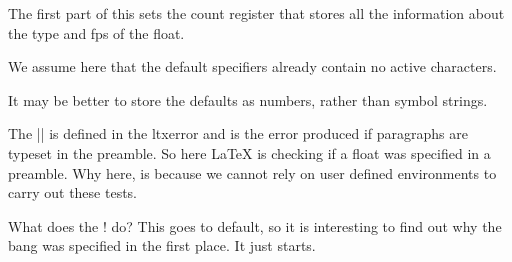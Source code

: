  \begin{macro}{\@xfloat}
     The first part of this sets the count register that stores all
     the information about the type and fps of the float.

    We assume here that the default specifiers already contain no
    active characters.

    It may be better to store the defaults as numbers, rather than
    symbol strings.

   The |\@nodocument| is defined in the ltxerror and is the error produced if paragraphs are typeset in the preamble. So here LaTeX is checking if a float was specified in a preamble. Why here, is because
we cannot rely on user defined environments to carry out these tests.

What does the ! do? This goes to default, so it is interesting to find out why the bang was specified
in the first place. It just starts.

    \begin{teX}
\def\@xfloat #1[#2]{%
  \@nodocument 
  \def \@captype {#1}%
   \def \@fps {#2}%
   \@onelevel@sanitize \@fps 
   \def \reserved@b {!}%
   \ifx \reserved@b \@fps
     \@fpsadddefault
   \else
     \ifx \@fps \@empty
       \@fpsadddefault
     \fi
   \fi
   \ifhmode
     \@bsphack
     \@floatpenalty -\@Mii
   \else
     \@floatpenalty-\@Miii
   \fi
  \ifinner
     \@parmoderr\@floatpenalty\z@
  \else
    \@next\@currbox\@freelist
      {%
       \@tempcnta \sixt@@n
       \expandafter \@tfor \expandafter \reserved@a
         \expandafter :\expandafter =\@fps 
         \do
          {%
           \if \reserved@a h%
             \ifodd \@tempcnta
             \else
               \advance \@tempcnta \@ne
             \fi
           \fi
           \if \reserved@a t%
             \@setfpsbit \tw@
           \fi
           \if \reserved@a b%
             \@setfpsbit 4%
           \fi
           \if \reserved@a p%
             \@setfpsbit 8%
           \fi
           \if \reserved@a !%
             \ifnum \@tempcnta>15
               \advance\@tempcnta -\sixt@@n\relax
             \fi
           \fi
           }%
       \@tempcntb \csname ftype@\@captype \endcsname
       \multiply \@tempcntb \@xxxii
       \advance \@tempcnta \@tempcntb
       \global \count\@currbox \@tempcnta
       }%
    \@fltovf
  \fi
    \end{teX}
    The remainder sets up the box in which the float is typeset, and
    the typesetting environment to be used.  It is essential to have
    the extra box to avoid the unwanted space that would otherwise
    often be put at the top of the float.

    It ends with a hook; not sure how useful this is but it is needed
    at present to deal with double-column floats.
    \begin{teX}
  \global \setbox\@currbox
    \color@vbox
      \normalcolor
      \vbox \bgroup
        \hsize\columnwidth
        \@parboxrestore
        \@floatboxreset
}
    \end{teX}
  \end{macro}
  

